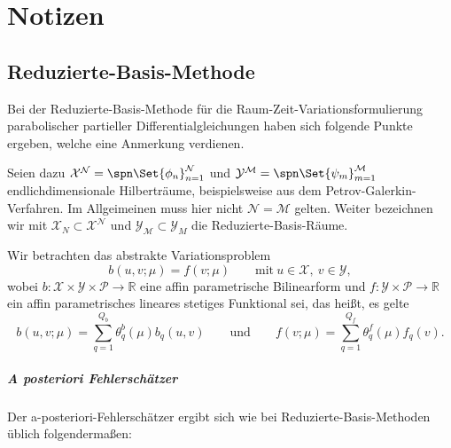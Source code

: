 
\chapter{Notizen} %
\label{cha:notizen}


\section{Reduzierte-Basis-Methode} %
\label{sec:reduzierte_basis_methode}

Bei der Reduzierte-Basis-Methode für die Raum-Zeit-Variationsformulierung parabolischer partieller Differentialgleichungen haben sich folgende Punkte ergeben, welche eine Anmerkung verdienen.

Seien dazu $\mathcal X^{\mathcal N} = \spn\Set{\phi_{n}}_{n=1}^{\mathcal N}$ und $\mathcal Y^{\mathcal M} = \spn\Set{\psi_{m}}_{m = 1}^{\mathcal M}$ endlichdimensionale Hilberträume, beispielsweise aus dem Petrov-Galerkin-Verfahren.
Im Allgeimeinen muss hier nicht $\mathcal N = \mathcal M$ gelten.
Weiter bezeichnen wir mit $\mathcal X_{N} \subset \mathcal X^{\mathcal N}$ und $\mathcal Y_{\mathcal M} \subset \mathcal Y_{M}$ die Reduzierte-Basis-Räume.

Wir betrachten das abstrakte Variationsproblem
\begin{equation}
    b(u, v; \mu) = f(v; \mu) \qquad \text{mit}~u \in \mathcal X,~v \in \mathcal Y,
\end{equation}
wobei $b \colon \mathcal X \times \mathcal Y \times \mathcal P \to \mathbb{R}$ eine affin parametrische Bilinearform und $f \colon \mathcal Y \times \mathcal P \to \mathbb{R}$ ein affin parametrisches lineares stetiges Funktional sei,
das heißt, es gelte
\begin{equation}
    b(u, v; \mu) = \sum_{q = 1}^{Q_b} \theta^{b}_{q}(\mu) b_{q}(u, v)
    \qquad \text{und} \qquad
    f(v; \mu) = \sum_{q = 1}^{Q_f} \theta^{f}_{q}(\mu) f_{q}(v).
\end{equation}

\paragraph{A posteriori Fehlerschätzer} %
\label{par:a_posteriori_fehlersch_tzer}

Der a-posteriori-Fehlerschätzer ergibt sich wie bei Reduzierte-Basis-Methoden üblich folgendermaßen:

